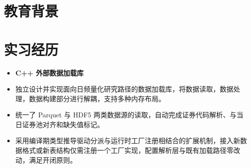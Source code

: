 \documentclass{resume}
\begin{document}



\sepspace
{}

\section{教育背景}


\section{实习经历}

\begin{itemize}[parsep=0.3ex]
\item[] \textbf{C++ 外部数据加载库}
\item \large 独立设计并实现面向日频量化研究路径的数据加载库，将数据读取，数据处理，数据构建部分进行解耦，支持多种内存布局。
\item \large 统一了 Parquet 与 HDF5 两类数据源的读取，自动完成证券代码解析、与当日证券池对齐和缺失值标记。
\item \large 采用编译期类型推导驱动分派与运行时工厂注册相结合的扩展机制，接入新数据格式或新表结构仅需注册一个工厂实现，配置解析层与既有加载路径零改动，满足开闭原则。
\end{itemize}
\end{document}
